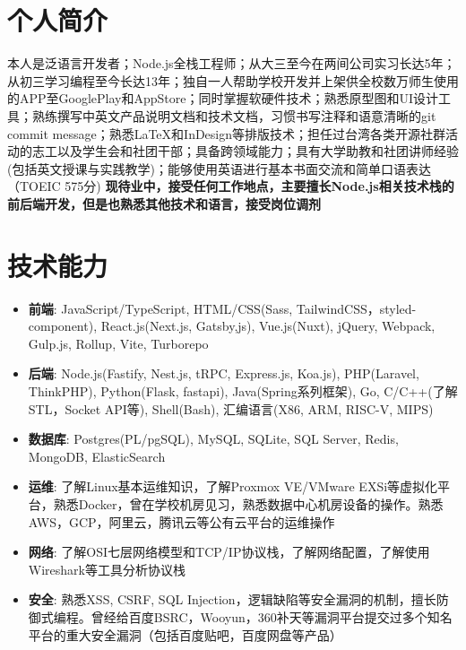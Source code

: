 \documentclass{resume}
\newcommand{\iconsection}[2]{
  \section[\texorpdfstring{#2}{#2}]{\faIcon{#1}\quad #2}
}
\begin{document}
\sloppy



\iconsection{user}{个人简介}
    本人是泛语言开发者；Node.js全栈工程师；从大三至今在两间公司实习长达5年；从初三学习编程至今长达13年；独自一人帮助学校开发并上架供全校数万师生使用的APP至GooglePlay和AppStore；同时掌握软硬件技术；熟悉原型图和UI设计工具；熟练撰写中英文产品说明文档和技术文档，习惯书写注释和语意清晰的git commit message；熟悉\LaTeX 和InDesign等排版技术；担任过台湾各类开源社群活动的志工以及学生会和社团干部；具备跨领域能力；具有大学助教和社团讲师经验(包括英文授课与实践教学)；能够使用英语进行基本书面交流和简单口语表达（TOEIC 575分)
    \newline \textbf{现待业中，接受任何工作地点，主要擅长Node.js相关技术栈的前后端开发，但是也熟悉其他技术和语言，接受岗位调剂}

\iconsection{wrench}{技术能力}
    \begin{itemize}
      \item \textbf{前端}: JavaScript/TypeScript, HTML/CSS(Sass, TailwindCSS，styled-component), React.js(Next.js, Gatsby,js), Vue.js(Nuxt), jQuery, Webpack, Gulp.js, Rollup, Vite, Turborepo
      \item \textbf{后端}: Node.js(Fastify, Nest.js, tRPC, Express.js, Koa.js), PHP(Laravel, ThinkPHP), Python(Flask, fastapi), Java(Spring系列框架), Go, C/C++(了解STL，Socket API等), Shell(Bash), 汇编语言(X86, ARM, RISC-V, MIPS)
      \item \textbf{数据库}: Postgres(PL/pgSQL), MySQL, SQLite, SQL Server, Redis, MongoDB, ElasticSearch
      \item \textbf{运维}: 了解Linux基本运维知识，了解Proxmox VE/VMware EXSi等虚拟化平台，熟悉Docker，曾在学校机房见习，熟悉数据中心机房设备的操作。熟悉AWS，GCP，阿里云，腾讯云等公有云平台的运维操作
      \item \textbf{网络}: 了解OSI七层网络模型和TCP/IP协议栈，了解网络配置，了解使用Wireshark等工具分析协议栈
      \item \textbf{安全}: 熟悉XSS, CSRF, SQL Injection，逻辑缺陷等安全漏洞的机制，擅长防御式编程。曾经给百度BSRC，Wooyun，360补天等漏洞平台提交过多个知名平台的重大安全漏洞（包括百度贴吧，百度网盘等产品）
    \end{itemize}
\end{document}
